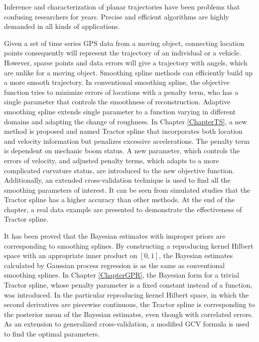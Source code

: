 
Inference and characterization of planar trajectories have been problems that confusing researchers for years. Precise and efficient algorithms are highly demanded in all kinds of applications. 

Given a set of time series GPS data from a moving object, connecting location points consequently will represent the trajectory of an individual or a vehicle. However, sparse points and data errors will give a trajectory with angels, which are unlike for a moving object. Smoothing spline methods can efficiently build up a more smooth trajectory. In conventional smoothing spline, the objective function tries to minimize errors of locations with a penalty term, who has a single parameter that controls the smoothness of reconstruction. Adaptive smoothing spline extends single parameter to a function varying in different domains and adapting the change of roughness. In Chapter \ref{ChapterTS}, a new method is proposed and named Tractor spline that incorporates both location and velocity information but penalizes excessive accelerations. The penalty term is dependent on mechanic boom status. A new parameter, which controls the errors of velocity, and adjusted penalty terms, which adapts to a more complicated curvature status, are introduced to the new objective function. Additionally, an extended cross-validation technique is used to find all the smoothing parameters of interest. It can be seen from simulated studies that the Tractor spline has a higher accuracy than other methods. At the end of the chapter, a real data example are presented to demonstrate the effectiveness of Tractor spline.


It has been proved that the Bayesian estimates with improper priors are corresponding to smoothing splines. By constructing a reproducing kernel Hilbert space with an appropriate inner product on $[0,1]$, the Bayesian estimates calculated by Gaussian process regression is as the same as conventional smoothing splines. In Chapter \ref{ChapterGPR}, the Bayesian form for a trivial Tractor spline, whose penalty parameter is a fixed constant instead of a function, was introduced. In the particular reproducing kernel Hilbert space, in which the second derivatives are piecewise continuous, the Tractor spline is corresponding to the posterior mean of the Bayesian estimates, even though with correlated errors. As an extension to generalized cross-validation, a modified GCV formula is used to find the optimal parameters. 


